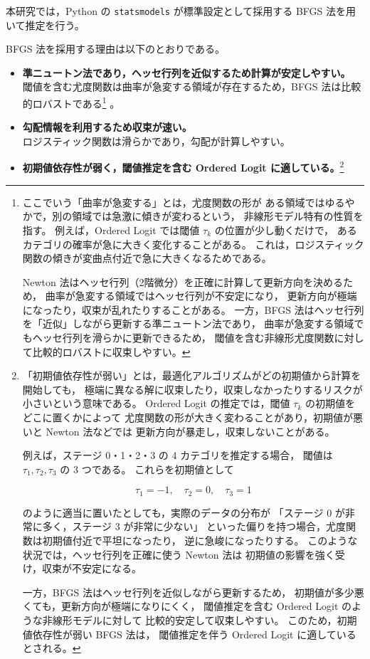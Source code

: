 本研究では，Python の \texttt{statsmodels} が標準設定として採用する
BFGS 法を用いて推定を行う。
\label{sec:bfgs_detail}

BFGS 法を採用する理由は以下のとおりである。

\begin{itemize}
    \item \textbf{準ニュートン法であり，ヘッセ行列を近似するため計算が安定しやすい。}\\  
    閾値を含む尤度関数は曲率が急変する領域が存在するため，BFGS 法は比較的ロバストである\footnote{
ここでいう「曲率が急変する」とは，尤度関数の形が
ある領域ではゆるやかで，別の領域では急激に傾きが変わるという，
非線形モデル特有の性質を指す。
例えば，Ordered Logit では閾値 $\tau_k$ の位置が少し動くだけで，
あるカテゴリの確率が急に大きく変化することがある。
これは，ロジスティック関数の傾きが変曲点付近で急に大きくなるためである。

Newton 法はヘッセ行列（2階微分）を正確に計算して更新方向を決めるため，
曲率が急変する領域ではヘッセ行列が不安定になり，
更新方向が極端になったり，収束が乱れたりすることがある。
一方，BFGS 法はヘッセ行列を「近似」しながら更新する準ニュートン法であり，
曲率が急変する領域でもヘッセ行列を滑らかに更新できるため，
閾値を含む非線形尤度関数に対して比較的ロバストに収束しやすい。
}
。

    \item \textbf{勾配情報を利用するため収束が速い。} \\ 
    ロジスティック関数は滑らかであり，勾配が計算しやすい。

    \item \textbf{初期値依存性が弱く，閾値推定を含む Ordered Logit に適している。}\footnote{
「初期値依存性が弱い」とは，最適化アルゴリズムがどの初期値から計算を開始しても，
極端に異なる解に収束したり，収束しなかったりするリスクが小さいという意味である。
Ordered Logit の推定では，閾値 $\tau_k$ の初期値をどこに置くかによって
尤度関数の形が大きく変わることがあり，初期値が悪いと Newton 法などでは
更新方向が暴走し，収束しないことがある。

例えば，ステージ 0・1・2・3 の 4 カテゴリを推定する場合，
閾値は $\tau_1,\tau_2,\tau_3$ の 3 つである。
これらを初期値として


\[
\tau_1=-1,\quad \tau_2=0,\quad \tau_3=1
\]


のように適当に置いたとしても，実際のデータの分布が
「ステージ 0 が非常に多く，ステージ 3 が非常に少ない」
といった偏りを持つ場合，尤度関数は初期値付近で平坦になったり，
逆に急峻になったりする。
このような状況では，ヘッセ行列を正確に使う Newton 法は
初期値の影響を強く受け，収束が不安定になる。

一方，BFGS 法はヘッセ行列を近似しながら更新するため，
初期値が多少悪くても，更新方向が極端になりにくく，
閾値推定を含む Ordered Logit のような非線形モデルに対して
比較的安定して収束しやすい。
このため，初期値依存性が弱い BFGS 法は，
閾値推定を伴う Ordered Logit に適しているとされる。
}
\\
\end{itemize}

